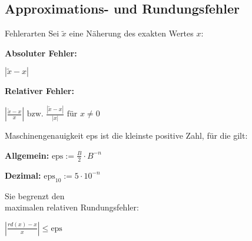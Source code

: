 \subsection{Approximations- und Rundungsfehler}

\begin{definition}{Fehlerarten}
Sei $\tilde{x}$ eine Näherung des exakten Wertes $x$:
\vspace{1mm}\\
\begin{minipage}[t]{0.45\textwidth}
    \textbf{Absoluter Fehler:} 
    \begin{center} $\left|\tilde{x}-x\right|$ \end{center}
\end{minipage}
\hspace{3mm}
\begin{minipage}[t]{0.5\textwidth}
    \textbf{Relativer Fehler:} 
    \begin{center} $\left|\frac{\tilde{x}-x}{x}\right| \text{ bzw. } \frac{|\tilde{x}-x|}{|x|} \text{ für } x \neq 0$ \end{center}
\end{minipage}
\end{definition}

\begin{lemma}{Maschinengenauigkeit} 
    eps ist die kleinste positive Zahl, für die gilt:
    \vspace{-3mm}\\
\begin{minipage}[b]{0.45\textwidth}
    \textbf{Allgemein:}  $\text{eps} := \frac{B}{2} \cdot B^{-n}$
\end{minipage}
\hspace{6mm}
\begin{minipage}[b]{0.45\textwidth}
    \textbf{Dezimal:}  $\text{eps}_{10} := 5 \cdot 10^{-n}$
\end{minipage}

\begin{minipage}[t]{0.6\textwidth}
    Sie begrenzt den\\ maximalen relativen Rundungsfehler:
\end{minipage}
\begin{minipage}{0.35\textwidth}
    \vspace{1mm}
    $\left|\frac{rd(x)-x}{x}\right| \leq \text{eps}$
\end{minipage}
\end{lemma}

